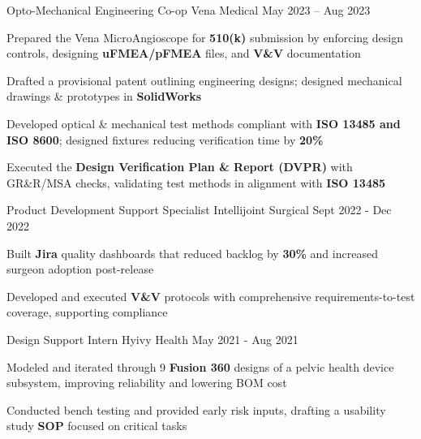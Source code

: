 \documentclass[11pt, a4paper]{russell}
\begin{document}
\begin{cventries}
\cventry
  {Opto-Mechanical Engineering Co-op} %
  {Vena Medical} %
  {} %
  {May 2023 -- Aug 2023} %
  {
    \begin{cvitems}
        \item {Prepared the Vena MicroAngioscope for \textbf{510(k)} submission by enforcing design controls, designing \textbf{uFMEA/pFMEA} files, and \textbf{V\&V} documentation}
        \item {Drafted a provisional patent outlining engineering designs; designed mechanical drawings \& prototypes in \textbf{SolidWorks}}
        \item {Developed optical \& mechanical test methods compliant with \textbf{ISO 13485 and ISO 8600}; designed fixtures reducing verification time by \textbf{20\%}}
        \item {Executed the \textbf{Design Verification Plan \& Report (DVPR)} with GR\&R/MSA checks, validating test methods in alignment with \textbf{ISO 13485}}
    \end{cvitems}
  }

\cventry
  {Product Development Support Specialist} %
  {Intellijoint Surgical} %
  {} %
  {Sept 2022 - Dec 2022} %
  {
    \begin{cvitems}
        \item {Built \textbf{Jira} quality dashboards that reduced backlog by \textbf{30\%} and increased surgeon adoption post-release}
        \item {Developed and executed \textbf{V\&V} protocols with comprehensive requirements-to-test coverage, supporting compliance}
    \end{cvitems}
  }

\cventry
  {Design Support Intern} %
  {Hyivy Health} %
  {} %
  {May 2021 - Aug 2021} %
  {
    \begin{cvitems}
        \item {Modeled and iterated through 9 \textbf{Fusion 360} designs of a pelvic health device subsystem, improving reliability and lowering BOM cost}
        \item {Conducted bench testing and provided early risk inputs, drafting a usability study \textbf{SOP} focused on critical tasks}
    \end{cvitems}
  }
\end{cventries}
\end{document}
